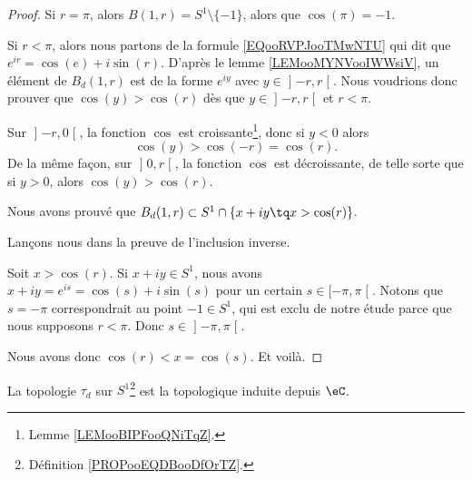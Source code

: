 \begin{proof}
	Si \( r=\pi\), alors \( B(1,r)=S^1\setminus\{ -1 \}\), alors que \( \cos(\pi)=-1\).

	Si \( r<\pi\), alors nous partons de la formule \eqref{EQooRVPJooTMwNTU} qui dit que \(  e^{ir}=\cos(e)+i\sin(r)\). D'après le lemme \ref{LEMooMYNVooIWWsiV}, un élément de \( B_d(1,r)\) est de la forme \(  e^{iy}\) avec \( y\in \mathopen] -r , r \mathclose[\). Nous voudrions donc prouver que \( \cos(y)>\cos(r)\) dès que \( y\in\mathopen] -r , r \mathclose[\) et \( r<\pi\).

		Sur \( \mathopen] -r , 0 \mathclose[\), la fonction \( \cos\) est croissante\footnote{Lemme \ref{LEMooBIPFooQNiTqZ}.}, donc si \( y<0\) alors
		\begin{equation}
			\cos(y)>\cos(-r)=\cos(r).
		\end{equation}
		De la même façon, sur \( \mathopen] 0,r \mathclose[\), la fonction \( \cos\) est décroissante, de telle sorte que si \( y>0\), alors \( \cos(y)>\cos(r)\).

	Nous avons prouvé que \( B_d(1,r)\subset S^1\cap  \{ x+iy\tq x>\cos(r) \}\).

	Lançons nous dans la preuve de l'inclusion inverse.

	Soit \( x>\cos(r)\). Si \( x+iy\in S^1\), nous avons \( x+iy= e^{is}=\cos(s)+i\sin(s)\) pour un certain \( s\in\mathopen[ -\pi , \pi \mathclose[\). Notons que \( s=-\pi\) correspondrait au point \( -1\in S^1\), qui est exclu de notre étude parce que nous supposons \( r<\pi\). Donc \( s\in\mathopen] -\pi , \pi \mathclose[\).

	Nous avons donc \( \cos(r)<x=\cos(s)\). Et voilà.
\end{proof}

\begin{proposition}
	La topologie \( \tau_d\) sur \( S^1\)\footnote{Définition \ref{PROPooEQDBooDfOrTZ}.} est la topologique induite depuis \( \eC\).
\end{proposition}


